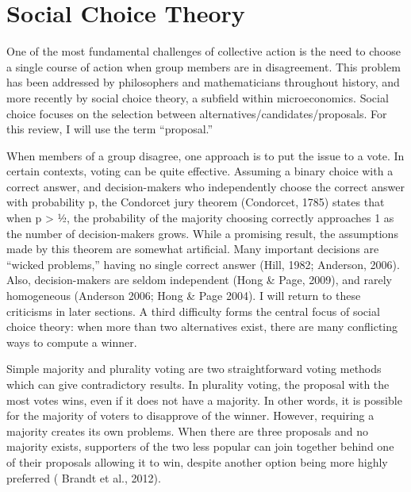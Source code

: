 \section{Social Choice Theory}
One of the most fundamental challenges of collective action is the need to choose a single course of action when group members are in disagreement. This problem has been addressed by philosophers and mathematicians throughout history, and more recently by social choice theory, a subfield within microeconomics. Social choice focuses on the selection between alternatives/candidates/proposals. For this review, I will use the term “proposal.”

When members of a group disagree, one approach is to put the issue to a vote. In certain contexts, voting can be quite effective. Assuming a binary choice with a correct answer, and decision-makers who independently choose the correct answer with probability p, the Condorcet jury theorem (Condorcet, 1785) states that when p > ½, the probability of the majority choosing correctly approaches 1 as the number of decision-makers grows. While a promising result, the assumptions made by this theorem are somewhat artificial. Many important decisions are “wicked problems,” having no single correct answer (Hill, 1982; Anderson, 2006). Also, decision-makers are seldom independent (Hong \& Page, 2009), and rarely homogeneous (Anderson 2006; Hong \& Page 2004). I will return to these criticisms in later sections. A third difficulty forms the central focus of social choice theory: when more than two alternatives exist, there are many conflicting ways to compute a winner.

Simple majority and plurality voting are two straightforward voting methods which can give contradictory results. In plurality voting, the proposal with the most votes wins, even if it does not have a majority. In other words, it is possible for the majority of voters to disapprove of the winner. However, requiring a majority creates its own problems. When there are three proposals and no majority exists, supporters of the two less popular can join together behind one of their proposals allowing it to win, despite another option being more highly preferred ( Brandt et al., 2012).

